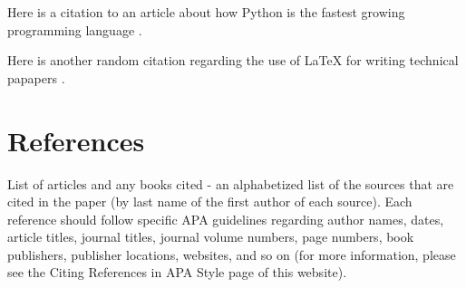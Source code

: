 \documentclass[12pt]{article}
\begin{document}
Here is a citation to an article about how Python is the fastest growing programming language \citep{srinath2017python}.

Here is another random citation regarding the use of LaTeX for writing technical papapers \citet{baramidze2013latex}.

\section*{References}
List of articles and any books cited - an alphabetized list of the sources that are cited in the paper (by last name of the first author of each source).  Each reference should follow specific APA guidelines regarding author names, dates, article titles, journal titles, journal volume numbers, page numbers, book publishers, publisher locations, websites, and so on (for more information, please see the Citing References in APA Style page of this website).



\end{document}
